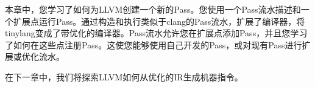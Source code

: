 本章中，您学习了如何为LLVM创建一个新的Pass。您使用一个Pass流水描述和一个扩展点运行Pass。通过构造和执行类似于clang的Pass流水，扩展了编译器，将tinylang变成了带优化的编译器。Pass流水允许您在扩展点添加Pass，并且您学习了如何在这些点注册Pass。这使您能够使用自己开发的Pass，或对现有Pass进行扩展或优化流水。\par

在下一章中，我们将探索LLVM如何从优化的IR生成机器指令。\par

\newpage